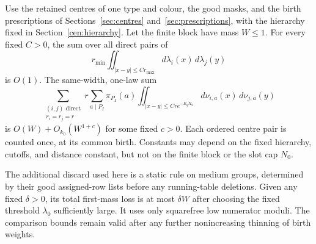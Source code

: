 \begin{proposition}\label{dir:birth-comparisons}
Use the retained centres of one type and colour, the good masks, and the
birth prescriptions of Sections~\ref{sec:centres}
and~\ref{sec:prescriptions}, with the hierarchy fixed in
Section~\ref{cen:hierarchy}. Let the finite block have mass $W\le1$.
For every fixed $C>0$, the sum over all
direct pairs of
\[
 r_{\min}\iint_{|x-y|\le C r_{\max}}
       d\lambda_i(x)\,d\lambda_j(y)
\]
is $O(1)$. The same-width, one-law sum
\[
 \sum_{\substack{(i,j)\text{ direct}\\r_i=r_j=r}}
 r\sum_{a\mid P_I}\pi_{P_I}(a)
 \iint_{|x-y|\le C r e^{-E_gX_0}}
       d\nu_{i,a}(x)\,d\nu_{j,a}(y)
\]
is $O(W)+O_{k_0}(W^{1+c})$ for some fixed $c>0$. Each ordered centre pair
is counted once, at its common birth. Constants may depend on the fixed
hierarchy, cutoffs, and distance constant, but not on the finite block or
the slot cap $N_0$.

The additional discard used here is a static rule on medium groups,
determined by their good assigned-row lists before any running-table
deletions. Given any fixed $\delta>0$, its total first-mass loss is at most
$\delta W$ after choosing the fixed threshold $\lambda_0$ sufficiently
large. It uses only squarefree low numerator moduli. The comparison bounds
remain valid after any further nonincreasing thinning of birth weights.
\end{proposition}

